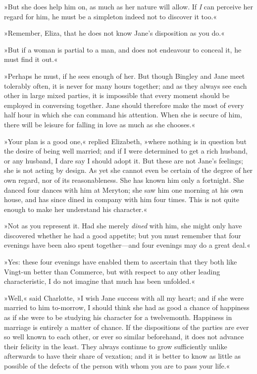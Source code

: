 »But she does help him on, as much as her nature will allow. If \textit{I} can perceive her regard for him, he must be a simpleton indeed not to discover it too.«

»Remember, Eliza, that he does not know Jane's disposition as you do.«

»But if a woman is partial to a man, and does not endeavour to conceal it, he must find it out.«

»Perhaps he must, if he sees enough of her. But though Bingley and Jane meet tolerably often, it is never for many hours together; and as they always see each other in large mixed parties, it is impossible that every moment should be employed in conversing together. Jane should therefore make the most of every half hour in which she can command his attention. When she is secure of him, there will be leisure for falling in love as much as she chooses.«

»Your plan is a good one,« replied Elizabeth, »where nothing is in question but the desire of being well married; and if I were determined to get a rich husband, or any husband, I dare say I should adopt it. But these are not Jane's feelings; she is not acting by design. As yet she cannot even be certain of the degree of her own regard, nor of its reasonableness. She has known him only a fortnight. She danced four dances with him at Meryton; she saw him one morning at his own house, and has since dined in company with him four times. This is not quite enough to make her understand his character.«

»Not as you represent it. Had she merely \textit{dined} with him, she might only have discovered whether he had a good appetite; but you must remember that four evenings have been also spent to\-geth\-er—and four evenings may do a great deal.«

»Yes: these four evenings have enabled them to ascertain that they both like Vingt-un better than Commerce, but with respect to any other leading characteristic, I do not imagine that much has been unfolded.«

»Well,« said Charlotte, »I wish Jane success with all my heart; and if she were married to him to-morrow, I should think she had as good a chance of happiness as if she were to be studying his character for a twelvemonth. Happiness in marriage is entirely a matter of chance. If the dispositions of the parties are ever so well known to each other, or ever so similar beforehand, it does not advance their felicity in the least. They always continue to grow sufficiently unlike afterwards to have their share of vexation; and it is better to know as little as possible of the defects of the person with whom you are to pass your life.«

